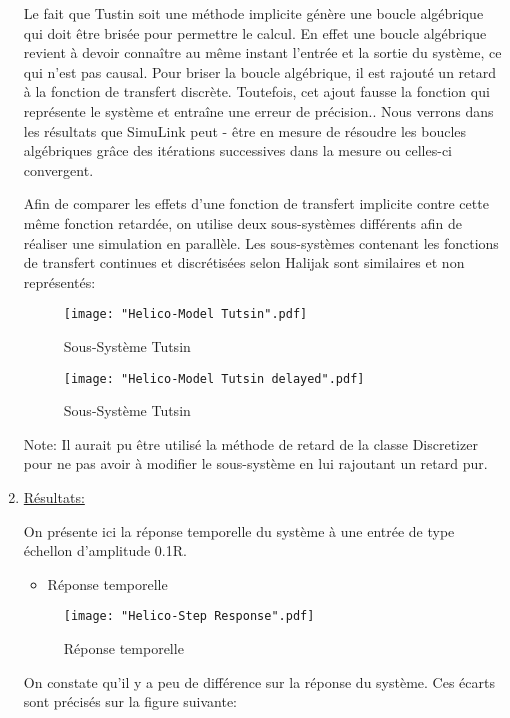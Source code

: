 \documentclass[a4paper,12pt,fleqn]{article}
\begin{document}
\begin{enumerate}
Le fait que Tustin soit une méthode implicite génère une boucle algébrique qui doit être brisée pour permettre le calcul. En effet une boucle algébrique revient à devoir connaître au même instant l'entrée et la sortie du système, ce qui n'est pas causal.
Pour briser la boucle algébrique, il est rajouté un retard à la fonction de transfert discrète. Toutefois, cet ajout fausse la fonction qui représente le système et entraîne une erreur de précision.. 
Nous verrons dans les résultats que SimuLink peut - être en mesure de résoudre les boucles algébriques grâce 
des itérations successives dans la mesure ou celles-ci convergent.

Afin de comparer les effets d'une fonction de transfert implicite contre cette même fonction retardée, on utilise deux sous-systèmes différents afin de réaliser une simulation en parallèle. Les sous-systèmes contenant les fonctions de transfert continues et discrétisées selon Halijak sont similaires et non représentés:

\begin{figure}[htb]
\centering
    \texttt{[image: "Helico-Model Tutsin".pdf]}
    \caption{Sous-Système Tutsin}
\end{figure}
\FloatBarrier

\begin{figure}[htb]
\centering
    \texttt{[image: "Helico-Model Tutsin delayed".pdf]}
    \caption{Sous-Système Tutsin}
\end{figure}
\FloatBarrier

Note: Il aurait pu être utilisé la méthode de retard de la classe Discretizer pour ne pas avoir à modifier le sous-système en lui rajoutant un retard pur.

\newpage
\item \underline{Résultats:}

On présente ici la réponse temporelle du système à une entrée de type échellon d'amplitude 0.1R.

\begin{itemize}
  \item Réponse temporelle
\end{itemize}

\begin{figure}[htb]
\centering
    \texttt{[image: "Helico-Step Response".pdf]}
    \caption{Réponse temporelle}
\end{figure}
\FloatBarrier

On constate qu'il y a peu de différence sur la réponse du système. Ces écarts sont précisés sur la figure suivante:


\end{enumerate}
\end{document}
